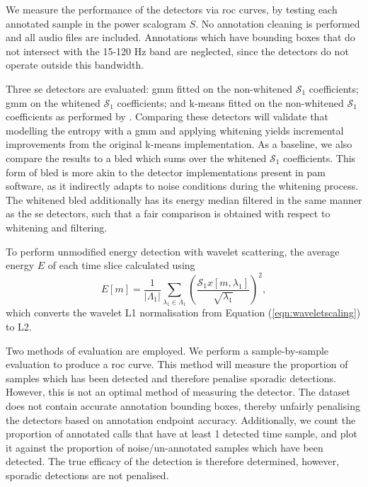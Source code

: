 {We measure the performance of the detectors via \ac{roc} curves, by testing each annotated sample in the power scalogram $S$. No annotation cleaning is performed and all audio files are included. Annotations which have bounding boxes that do not intersect with the 15-120 Hz band are neglected, since the detectors do not operate outside this bandwidth.

Three \ac{se} detectors are evaluated: \ac{gmm} fitted on the non-whitened $\mathcal{S}_1$ coefficients; \ac{gmm} on the whitened $\mathcal{S}_1$ coefficients; and k-means fitted on the non-whitened $\mathcal{S}_1$ coefficients as performed by \citet{mypaper}. Comparing these detectors will validate that modelling the entropy with a \ac{gmm} and applying whitening yields incremental improvements from the original k-means implementation. As a baseline, we also compare the results to a \ac{bled} which sums over the whitened $\mathcal{S}_1$ coefficients. This form of \ac{bled} is more akin to the detector implementations present in \ac{pam} software, as it indirectly adapts to noise conditions during the whitening process. The whitened \ac{bled} additionally has its energy median filtered in the same manner as the \ac{se} detectors, such that a fair comparison is obtained with respect to whitening and filtering.

To perform unmodified energy detection with wavelet scattering, the average energy $E$ of each time slice calculated using
\begin{equation}
\label{eqn:bled_power}
    E[m] = \frac{1}{\left| \Lambda_1 \right|}\sum_{\lambda_1 \in \Lambda_1} \left(\frac{\mathcal{S}_1 x [m, \lambda_1]}{\sqrt{\lambda_1}}\right)^2,
\end{equation}
which converts the wavelet L1 normalisation from Equation (\ref{eqn:waveletscaling}) to L2. 

Two methods of evaluation are employed. We perform a sample-by-sample evaluation to produce a \ac{roc} curve. This method will measure the proportion of samples which has been detected and therefore penalise sporadic detections. However, this is not an optimal method of measuring the detector. The dataset does not contain accurate annotation bounding boxes, thereby unfairly penalising the detectors based on annotation endpoint accuracy. Additionally, we count the proportion of annotated calls that have at least 1 detected time sample, and plot it against the proportion of noise/un-annotated samples which have been detected. The true efficacy of the detection is therefore determined, however, sporadic detections are not penalised.




}

